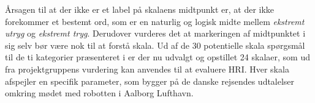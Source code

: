 \noindent
%
Årsagen til at der ikke er et label på skalaens midtpunkt er, at der ikke forekommer et bestemt ord, som er en naturlig og logisk midte mellem \textit{ekstremt utryg} og \textit{ekstremt tryg}. Derudover vurderes det at markeringen af midtpunktet i sig selv bør være nok til at forstå skala.\blankline
%
Ud af de 30 potentielle skala spørgsmål til de ti kategorier præsenteret i  er der nu udvalgt og opstillet 24 skalaer, som ud fra projektgruppens vurdering kan anvendes til at evaluere HRI. Hver skala afspejler en specifik parameter, som bygger på de danske rejsendes udtalelser omkring mødet med robotten i Aalborg Lufthavn.     
